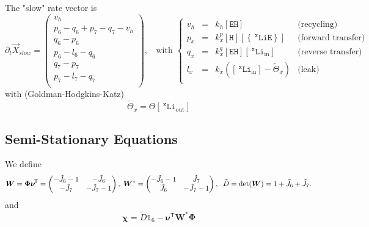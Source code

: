 \documentclass[aps,onecolumn,12pt]{revtex4}
\newcommand{\mychem}[1]{\mathtt{#1}}
\newcommand{\myconc}[1]{\left\lbrack{#1}\right\rbrack}
\newcommand{\spLi}[1]{{~^{\mychem{#1}}\mychem{Li}}}
\newcommand{\spEout}{\mychem{E}}
\newcommand{\spLiE}[1]{\left\lbrace\spLi{#1}\spEout\right\rbrace}
\newcommand{\LiE}[1]{\myconc{\spLiE{#1}}}
\newcommand{\spLiIn}[1]{{\spLi{#1}}_{\mathrm{in}}}
\newcommand{\LiIn}[1]{\myconc{\spLiIn{#1}}}
\newcommand{\spLiOut}[1]{{\spLi{#1}}_{\mathrm{out}}}
\newcommand{\LiOut}[1]{\myconc{\spLiOut{#1}}}
\newcommand{\spEHin}{\mychem{EH}}
\newcommand{\EHin}{\myconc{\spEHin}}
\newcommand{\spproton}{\mychem{H}}
\newcommand{\proton}{\myconc{\spproton}}
\newcommand{\mytrn}[1]{{#1}^{\!\mathsf{T}}}
\newcommand{\mymat}[1]{{\bm{#1}}}
\begin{document}
The "slow" rate vector is
\begin{equation}
	\partial_t\vec{X}_{slow} = 
	\begin{pmatrix}
		v_h\\
		p_6-q_6+p_7-q_7-v_h\\
		q_6-p_6\\
		p_6-l_6-q_6\\
		q_7-p_7\\
		p_7-l_7-q_7\\
	\end{pmatrix}
	,\;\;\text{ with }
	\left\lbrace
	\begin{array}{rcll}
	v_h & = & k_h \EHin & \text{(recycling)}\\
	p_x & = & k_x^p \proton \LiE{x} & \text{(forward transfer)}\\
	q_x & = & k_x^q \EHin \LiIn{x} & \text{(reverse transfer)} \\
	l_x & = & k_x  \left(\LiIn{x}-\tilde{\Theta}_x\right) & \text{(leak)}\\
	\end{array}
	\right.
\end{equation}
with (Goldman-Hodgkins-Katz)
\begin{equation}
	\tilde{\Theta}_x = \Theta \LiOut{x}
\end{equation}

\subsection{Semi-Stationary Equations}
We define
\begin{equation}
	\mymat{W} = \mymat{\Phi}\mytrn{\mymat{\nu}} = \begin{pmatrix} -\tilde{J}_6-1 & -\tilde{J}_6 \cr -\tilde{J}_7 & -\tilde{J}_7-1\end{pmatrix}
	,\;\mymat{W}^\ast = \begin{pmatrix} -\tilde{J}_6-1 & \tilde{J}_7 \cr \tilde{J}_6 & -\tilde{J}_7-1\end{pmatrix}
	,\;\; \tilde{D} =\det(\mymat{W})=1+\tilde{J}_6+\tilde{J}_7.
\end{equation}
and
\begin{equation}
	\mymat{\chi} = \tilde{D}\mathds{1}_6-\mytrn{\mymat{\nu}}\mymat{W}^\ast\mymat{\Phi}
\end{equation}
\end{document}

